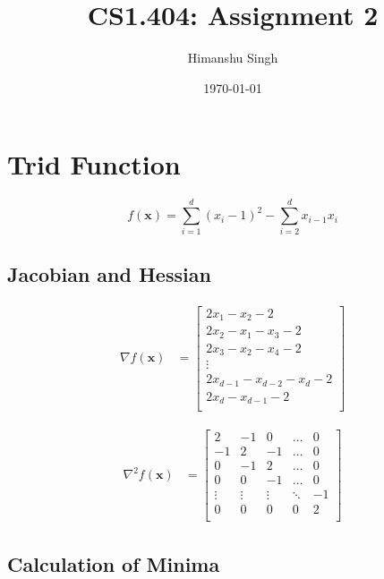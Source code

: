 \documentclass[a4paper]{article}
\title{CS1.404: Assignment 2}
\author{Himanshu Singh}
\date{\today}
\begin{document}
\maketitle

\section{Trid Function}

$$f(\textbf{x}) = \sum_{i=1}^d (x_i - 1)^2 - \sum_{i=2}^d x_{i-1} x_i$$

\subsection{Jacobian and Hessian}

\begin{align*}
\nabla f(\textbf{x}) &=
    \begin{bmatrix}
        2 x_1 - x_2 - 2 \\
        2 x_2 - x_1 - x_3 - 2 \\
        2 x_3 - x_2 - x_4 - 2 \\
        \vdots \\
        2 x_{d-1} - x_{d-2} - x_d - 2 \\
        2 x_d - x_{d-1} - 2 \\
    \end{bmatrix}
\end{align*}

\begin{align*}
\nabla^2 f(\textbf{x}) &=
    \begin{bmatrix}
        2 & -1 & 0 & \dots & 0 \\
        -1 & 2 & -1 & \dots & 0 \\
        0 & -1 & 2 & \dots & 0 \\
        0 & 0 & -1 & \dots & 0 \\
        \vdots & \vdots & \vdots & \ddots & -1 \\
        0 & 0 & 0 & 0 & 2 \\
    \end{bmatrix}
\end{align*}

\subsection{Calculation of Minima}
\end{document}

